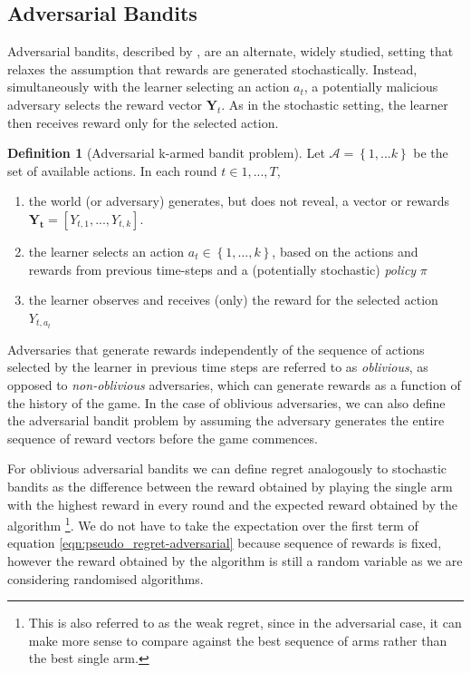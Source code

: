 \documentclass[11pt,a4paper,oneside]{book}
\newcommand{\actionspace}{\mathcal{A}}
\newcommand{\set}[1]{\left\{#1\right\}}
\renewcommand{\vec}[1]{\boldsymbol{#1}}
\theoremstyle{plain}
\theoremstyle{definition}
\newtheorem{definition}[theorem]{Definition}
\begin{document}
\subsection{Adversarial Bandits}

Adversarial bandits, described by \citet{Auer1995}, are an alternate, widely studied, setting that relaxes the assumption that rewards are generated stochastically. Instead, simultaneously with the learner selecting an action $a_t$, a potentially malicious adversary selects the reward vector $\boldsymbol{Y}_t$. As in the stochastic setting, the learner then receives reward only for the selected action. 

\vspace{0.5cm}
\begin{definition}[Adversarial k-armed bandit problem]
\label{def:adversarial-k-armed-bandit}
Let $\actionspace = \set{1,...k}$ be the set of available actions.  In each round $t \in 1,...,T$, 
\begin{enumerate}
\item the world (or adversary) generates, but does not reveal, a vector or rewards $\vec{Y_t}=[Y_{t,1},...,Y_{t,k}]$. 
\item the learner selects an action $a_{t} \in \set{1,...,k}$, based on the actions and rewards from previous time-steps and a (potentially stochastic) \emph{policy} $\pi$
\item the learner observes and receives (only) the reward for the selected action $Y_{t,a_t}$ 
\end{enumerate} 
\end{definition}

Adversaries that generate rewards independently of the sequence of actions selected by the learner in previous time steps are referred to as \emph{oblivious}, as opposed to \emph{non-oblivious} adversaries, which can generate rewards as a function of the history of the game. In the case of oblivious adversaries, we can also define the adversarial bandit problem by assuming the adversary generates the entire sequence of reward vectors before the game commences. 

For oblivious adversarial bandits we can define regret analogously to stochastic bandits as the difference between the reward obtained by playing the single arm with the highest reward in every round and the expected reward obtained by the algorithm \footnote{This is also referred to as the weak regret, since in the adversarial case, it can make more sense to compare against the best sequence of arms rather than the best single arm.}. We do not have to take the expectation over the first term of equation \ref{eqn:pseudo_regret-adversarial} because sequence of rewards is fixed, however the reward obtained by the algorithm is still a random variable as we are considering randomised algorithms.  
\end{document}
